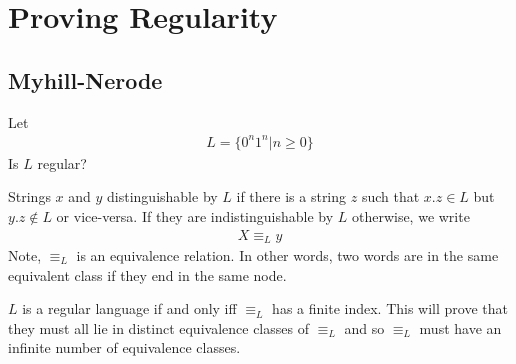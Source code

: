 \documentclass[a4paper]{article}
\theoremstyle{plain}
\newtheorem{thm}{Theorem}[section]
\theoremstyle{definition}
\newtheorem{defn}{Definition}[section]
\newtheorem{exmp}{Example}[section]
\theoremstyle{remark}
\begin{document}
\section{Proving Regularity}
\subsection{Myhill-Nerode}
\begin{tcolorbox}[colback=black!3!white,colframe=black!60!white,title=\begin{exmp}Language L \label{Language L}\end{exmp}]
        Let
                \begin{align}
                L = \{0^{n}1^{n} | n\ge 0 \}
                \end{align}
		Is $L$ regular?
\end{tcolorbox}
\begin{tcolorbox}[colback=black!3!white,colframe=black!60!white,title=\begin{defn}Distinguishability \label{Distinguishability}\end{defn}]
Strings $x$ and $y$ distinguishable by $L$ if there is a string $z$ such that $x.z \in L$ but $y.z \not\in L$ or vice-versa. If they are indistinguishable by $L$ otherwise, we write
\begin{align}
	X \equiv_L y
\end{align}
Note, $\equiv_L$ is an equivalence relation. In other words, two words are in the same equivalent class if they end in the same node.
\end{tcolorbox}
\begin{tcolorbox}[colback=black!3!white,colframe=black!60!white,title=\begin{thm}Myhill-Nerode\label{Regularity}\end{thm}]
	$L$ is a regular language if and only iff $\equiv_L$ has a finite index. This will prove that they must all lie in distinct equivalence classes of $\equiv_L$ and so $\equiv_L$ must have an infinite number of equivalence classes.
\end{tcolorbox}
\end{document}
